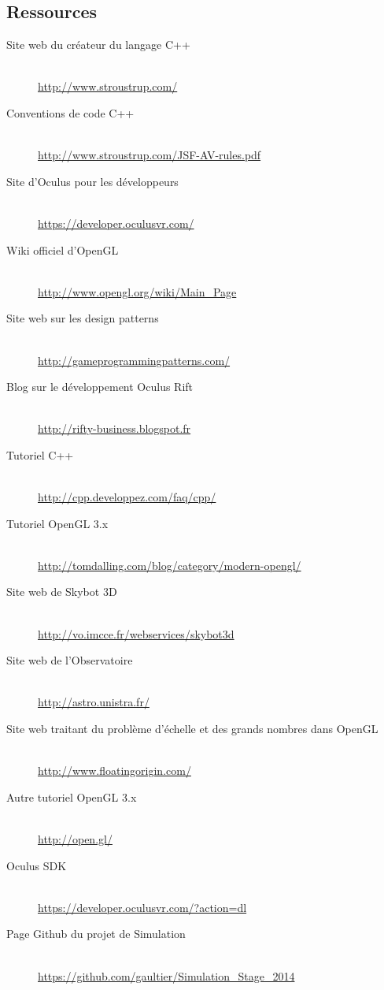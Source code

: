 \documentclass[a4paper,french,12pt]{article}
\begin{document}
	\subsection{Ressources}
	  \begin{description}
	  \item [Site web du créateur du langage C++]~\\
	      \url{http://www.stroustrup.com/}
	  \item [Conventions de code C++]~\\
	      \url{http://www.stroustrup.com/JSF-AV-rules.pdf}
	  \item [Site d'Oculus pour les développeurs]~\\
	      \url{https://developer.oculusvr.com/}
	  \item [Wiki officiel d'OpenGL]~\\
	      \url{http://www.opengl.org/wiki/Main_Page}
	  \item [Site web sur les design patterns]~\\
	      \url{http://gameprogrammingpatterns.com/}
	  \item [Blog sur le développement Oculus Rift]~\\
	      \url{http://rifty-business.blogspot.fr}
	  \item [Tutoriel C++]~\\
	      \url{http://cpp.developpez.com/faq/cpp/}
	  \item [Tutoriel OpenGL 3.x]~\\
	      \url{http://tomdalling.com/blog/category/modern-opengl/}  
	  \item [Site web de Skybot 3D]~\\
	      \url{http://vo.imcce.fr/webservices/skybot3d}  
	  \item [Site web de l'Observatoire]~\\
	      \url{http://astro.unistra.fr/}  
	  \item [Site web traitant du problème d'échelle et des grands nombres dans OpenGL]~\\
	      \url{http://www.floatingorigin.com/}  
	  \item [Autre tutoriel OpenGL 3.x]~\\
	      \url{http://open.gl/}  
	  \item [Oculus SDK]~\\
	      \url{https://developer.oculusvr.com/?action=dl}  
	  \item [Page Github du projet de Simulation]~\\
	    \url{https://github.com/gaultier/Simulation_Stage_2014}
	  \end{description}

	
	
\end{document}
